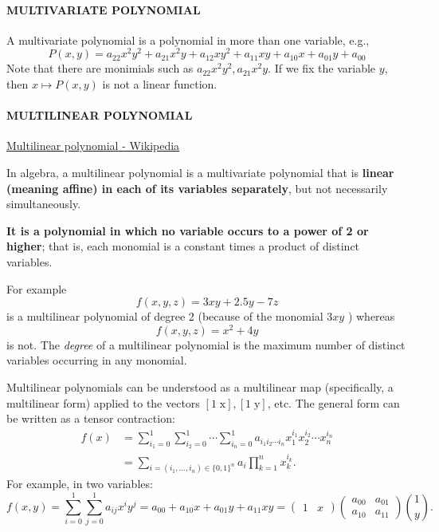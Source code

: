 
\paragraph{MULTIVARIATE POLYNOMIAL}

A multivariate polynomial is a polynomial in more than one variable, e.g., 
$$
P(x, y)
=a_{22} x^2 y^2+a_{21} x^2 y+a_{12} x y^2+a_{11} x y+a_{10} x+a_{01} y+a_{00}
$$
Note that there are monimials such as $a_{22} x^2 y^2, a_{21} x^2 y$. If we fix the variable $y$, then $x \mapsto P(x,y)$ is not a linear function.

\paragraph{MULTILINEAR POLYNOMIAL} %

\href{https://en.wikipedia.org/wiki/Multilinear_polynomial}{Multilinear polynomial - Wikipedia}

In algebra, a multilinear polynomial is a multivariate polynomial that is \textbf{linear (meaning affine) in each of its variables separately}, but not necessarily simultaneously. 

\textbf{It is a polynomial in which no variable occurs to a power of 2 or higher}; that is, each monomial is a constant times a product of distinct variables. 

For example 
$$
f(x, y, z)=3 x y+2.5 y -7 z
$$
is a multilinear polynomial of degree 2 (because of the monomial $3 x y$ ) whereas $$
f(x, y, z)=x^2+4 y
$$
is not. The \textit{degree} of a multilinear polynomial is the maximum number of distinct variables occurring in any monomial.

Multilinear polynomials can be understood as a multilinear map (specifically, a multilinear form) applied to the vectors $[1 \; \mathrm{x}],[1 \; \mathrm{y}]$, etc. The general form can be written as a tensor contraction:
\begin{align}
    f(x)&=\sum_{i_1=0}^1 \sum_{i_2=0}^1 \cdots \sum_{i_n=0}^1 a_{i_1 i_2 \cdots i_n} x_1^{i_1} x_2^{i_2} \cdots x_n^{i_n}\\
    &=\sum_{i=\left(i_1, \ldots ,i_n\right) \in\{0,1\}^n} a_i \prod_{k=1}^n x_k^{i_k}.
\end{align}
For example, in two variables:
$$
f(x, y)=\sum_{i=0}^1 \sum_{j=0}^1 a_{i j} x^i y^j=a_{00}+a_{10} x+a_{01} y+a_{11} x y=\left(\begin{array}{ll}
1 & x
\end{array}\right)\left(\begin{array}{cc}
a_{00} & a_{01} \\
a_{10} & a_{11}
\end{array}\right)\binom{1}{y}.
$$